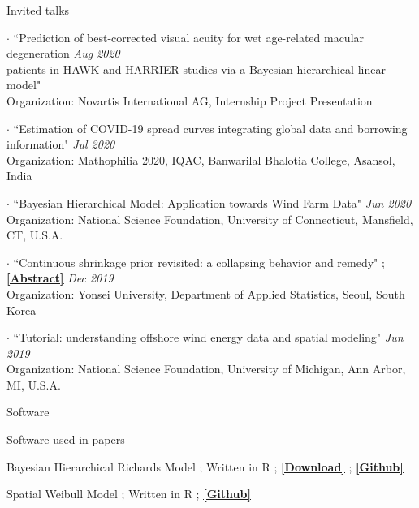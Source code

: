 \documentclass{resume} %
\begin{document}
\begin{rSection}{Invited talks}
\item[$\cdot$]
{``Prediction of best-corrected visual acuity for wet age-related macular degeneration}  \hfill {\em Aug 2020}
\\
{ patients in HAWK and HARRIER studies via a Bayesian hierarchical linear model"}
\\
Organization: Novartis International AG, Internship Project Presentation

\item[$\cdot$]
{``Estimation of COVID-19 spread curves integrating global data and borrowing  information"}  \hfill {\em Jul 2020}
\\
Organization: Mathophilia 2020, IQAC, Banwarilal Bhalotia College, Asansol, India


\item[$\cdot$]
{``Bayesian Hierarchical Model: Application towards Wind
Farm Data"}  \hfill {\em Jun 2020}
\\
Organization: National Science Foundation, University of Connecticut, Mansfield, CT, U.S.A.

\item[$\cdot$]
{``Continuous shrinkage prior revisited: a collapsing behavior and remedy"}  
;
\href{https://stat.yonsei.ac.kr/stat/board/grad_notice.do?mode=view&articleNo=76831&article.offset=0&articleLimit=10}
{\underline{\textbf{[Abstract]}}}
\hfill {\em Dec 2019}
\\
Organization: Yonsei University, Department of Applied Statistics, Seoul, South Korea


\item[$\cdot$]
{``Tutorial: understanding offshore wind energy data and spatial modeling"}  \hfill {\em Jun 2019}
\\
Organization: National Science Foundation, University of Michigan, Ann Arbor, MI, U.S.A.
\end{rSection}

\newpage
\begin{rSection}{Software}
\begin{rSubsection}
{Software used in papers}{}{}{}
\item 
\textsf{Bayesian Hierarchical Richards Model} 
;
Written in R
;
\href{http://www.plosone.org/article/fetchSingleRepresentation.action?uri=info:doi/10.1371/journal.pone.0236860.s005}
{\underline{\textbf{[Download]}}}
;
\href{https://github.com/StevenBoys/BHRM}{\underline{\textbf{[Github]}}}

\item 
\textsf{Spatial Weibull Model} 
;
Written in R
;
\href{https://github.com/yain22/SWM}
{\underline{\textbf{[Github]}}}
\end{rSubsection}
\end{rSection}
\end{document}
